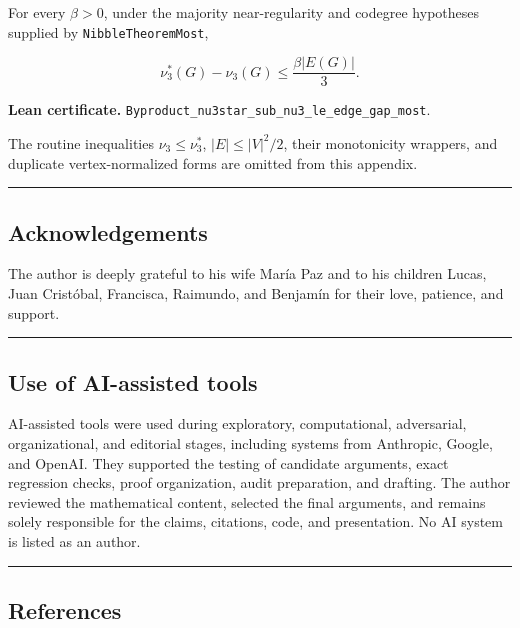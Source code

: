 \documentclass[
  american,
  11pt,
  a4paper,
]{article}
\begin{document}
For every \(\beta>0\), under the majority near-regularity and codegree hypotheses supplied by \texttt{NibbleTheoremMost},

\[
\nu_3^*(G)-\nu_3(G)
\le
\frac{\beta|E(G)|}{3}.
\]

\textbf{Lean certificate.} \texttt{Byproduct\_nu3star\_sub\_nu3\_le\_edge\_gap\_most}.

The routine inequalities \(\nu_3\le\nu_3^*\), \(|E|\le|V|^2/2\), their monotonicity wrappers, and duplicate vertex-normalized forms are omitted from this appendix.

\begin{center}\rule{0.5\linewidth}{0.5pt}\end{center}

\subsection{Acknowledgements}\label{acknowledgements}

The author is deeply grateful to his wife María Paz and to his children Lucas, Juan Cristóbal, Francisca, Raimundo, and Benjamín for their love, patience, and support.

\begin{center}\rule{0.5\linewidth}{0.5pt}\end{center}

\subsection{Use of AI-assisted tools}\label{use-of-ai-assisted-tools}

AI-assisted tools were used during exploratory, computational, adversarial, organizational, and editorial stages, including systems from Anthropic, Google, and OpenAI. They supported the testing of candidate arguments, exact regression checks, proof organization, audit preparation, and drafting. The author reviewed the mathematical content, selected the final arguments, and remains solely responsible for the claims, citations, code, and presentation. No AI system is listed as an author.

\begin{center}\rule{0.5\linewidth}{0.5pt}\end{center}

\begingroup
\setlength{\parskip}{2pt plus 1pt minus 1pt}
\subsection{References}\label{references}
\end{document}
